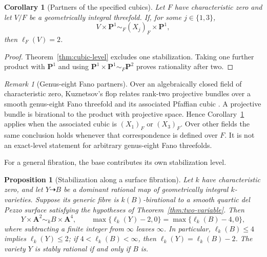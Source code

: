 \documentclass[11pt]{article}
\newtheorem{proposition}[theorem]{Proposition}
\newtheorem{corollary}[theorem]{Corollary}
\theoremstyle{remark}
\newtheorem{remark}[theorem]{Remark}
\newcommand{\A}{\mathbf A}
\newcommand{\PP}{\mathbf P}
\begin{document}
\begin{corollary}[Partners of the specified cubics]
\label{cor:partner-level}
%
%
Let \(F\) have characteristic zero and let \(V/F\) be a geometrically
integral threefold.  If, for some \(j\in\{1,3\}\),
\[
 V\times\PP^1\sim_F (X_j)_F\times\PP^1,
\]
then \(\ell_F(V)=2\).
\end{corollary}

\begin{proof}
Theorem~\ref{thm:cubic-level} excludes one stabilization. Taking one
further product with \(\PP^1\) and using
\(\PP^1\times\PP^1\sim_F\PP^2\) proves rationality after two.
%
\end{proof}

\begin{remark}[Genus-eight Fano partners]
\label{rem:fano-partners}
%
%
%
Over an algebraically closed field of characteristic zero, Kuznetsov's
flop relates rank-two projective bundles over a smooth genus-eight Fano
threefold and its associated Pfaffian cubic
\cite[Theorems~2.17--2.18]{KuznetsovV14}.  A projective bundle is birational
to the product with projective space.  Hence
Corollary~\ref{cor:partner-level} applies when the associated cubic is
\((X_1)_F\) or \((X_3)_F\).  Over other fields the same conclusion holds
whenever that correspondence is defined over \(F\).  It is not an exact-level
statement for arbitrary genus-eight Fano threefolds.
\end{remark}

For a general fibration, the base contributes its own stabilization level.

\begin{proposition}[Stabilization along a surface fibration]
\label{prop:fibration-level}
%
%
Let \(k\) have characteristic zero, and let \(Y\dashrightarrow B\) be a
dominant rational map of geometrically integral \(k\)-varieties.  Suppose
its generic fibre is \(k(B)\)-birational to a smooth quartic del Pezzo
surface satisfying the hypotheses of Theorem~\ref{thm:two-variable}.
Then
\[
 Y\times\A^2\sim_k B\times\A^4,
 \qquad
 \max\{\ell_k(Y)-2,0\}=\max\{\ell_k(B)-4,0\},
\]
where subtracting a finite integer from \(\infty\) leaves \(\infty\).
In particular, \(\ell_k(B)\leq4\) implies \(\ell_k(Y)\leq2\);
if \(4<\ell_k(B)<\infty\), then \(\ell_k(Y)=\ell_k(B)-2\).
The variety \(Y\) is stably rational if and only if \(B\) is.
\end{proposition}
\end{document}
